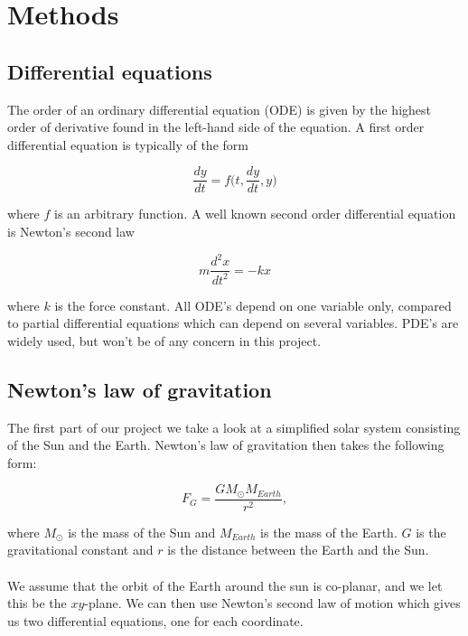 \documentclass[a4paper, fontsize=11pt]{article}
\begin{document}
\section{Methods}


\subsection{Differential equations}
The order of an ordinary differential equation (ODE) is given by the highest order of derivative found in the left-hand side of the equation. A first order differential equation is typically of the form 

\begin{equation}
\dfrac{dy}{dt} = f\big(t,\dfrac{dy}{dt},y\big)
\end{equation}

where $f$ is an arbitrary function. A well known second order differential equation is Newton's second law 

\begin{equation}
m \dfrac{d^2 x}{dt^2}=-kx
\end{equation}

where $k$ is the force constant. All ODE's depend on one variable only, compared to partial differential equations which can depend on several variables. PDE's are widely used, but won't be of any concern in this project.


\subsection{Newton's law of gravitation}
The first part of our project we take a look at a simplified solar system consisting of the Sun and the Earth. Newton's law of gravitation then takes the following form:

\begin{equation}
F_{G} = \dfrac{G M_{\odot}M_{Earth}}{r^2},
\end{equation}

where $M_{\odot}$ is the mass of the Sun and $M_{Earth}$ is the mass of the Earth. $G$ is the gravitational constant and $r$ is the distance between the Earth and the Sun.

\paragraph{}
We assume that the orbit of the Earth around the sun is co-planar, and we let this be the $xy$-plane. We can then use Newton's second law of motion which gives us two differential equations, one for each coordinate.
\end{document}
